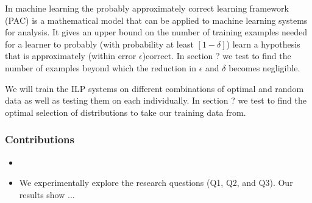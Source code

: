 In machine learning the probably approximately correct learning framework (PAC) is a mathematical model that can be applied to machine learning systems for analysis. It gives an upper bound on the number of training examples needed for a learner to probably (with probability at least $[1-\delta]$) learn a hypothesis that is approximately (within error $\epsilon$)correct\cite{Mitchell/MachineLearing}. In section ? we test to find the number of examples beyond which the reduction in $\epsilon$ and $\delta$ becomes negligible.

We will train the ILP systems on different combinations of optimal and random data as well as testing them on each individually. In section ? we test to find the optimal selection of distributions to take our training data from.

\subsubsection{Contributions}
\begin{itemize}
\item %
\item We experimentally explore the research questions (Q1, Q2, and Q3). Our results show ...
\end{itemize}